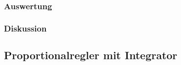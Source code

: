 \documentclass[12pt,a4paper]{article}
\begin{document}
\subsubsection*{Auswertung}
\subsubsection*{Diskussion}



\subsection{Proportionalregler mit Integrator}
\end{document}
